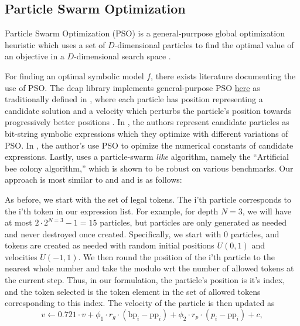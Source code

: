 \documentclass[runningheads]{llncs}
\begin{document}
\subsection{Particle Swarm Optimization} \label{subsec:ParticleSwarmOptimization}
Particle Swarm Optimization (PSO) is a general-purrpose global optimization heuristic which uses a set of $D$-dimensional particles to find the optimal value of an objective in a $D$-dimensional search space \cite{clerc:hal-00764996}. 
\par For finding an optimal symbolic model $f$, there exists literature documenting the use of PSO. The deap library implements general-purpose PSO \href{https://github.com/DEAP/deap/blob/60913c5543abf8318ddce0492e8ffcdf37974d86/examples/pso/basic.py}{here} as traditionally defined in \cite{PoliOverviewPSO}, where each particle has position representing a candidate solution and a velocity which perturbs the particle's position towards progressively better positions \cite{DEAP_JMLR2012}. In \cite{10.1007/978-3-319-70093-9_37}, the authors represent candidate particles as bit-string symbolic expressions which they optimize with different variations of PSO. In \cite{Lu2021}, the author's use PSO to opimize the numerical constants of candidate expressions. Lastly, \cite{KARABOGA20121} uses a particle-swarm \emph{like} algorithm, namely the ``Artificial bee colony algorithm,'' which is shown to be robust on various benchmarks. Our approach is most similar to \cite{DEAP_JMLR2012} and \cite{10.1007/978-3-319-70093-9_37} and is as follows:
\par As before, we start with the set of legal tokens. The i'th particle corresponds to the i'th token in our expression list. For example, for depth $N = 3$, we will have at most $2\cdot 2^{N = 3} - 1 = 15$ particles, but particles are only generated as needed and never destroyed once created. Specifically, we start with 0 particles, and tokens are created as needed with random initial positions $U(0,1)$ and velocities $U(-1,1)$. We then round the position of the i'th particle to the nearest whole number and take the modulo wrt the number of allowed tokens at the current step. Thus, in our formulation, the particle's position is it's index, and the token selected is the token element in the set of allowed tokens corresponding to this index. The velocity of the particle is then updated as \cite{clerc:hal-00764996} \cite{offShellPSO}
\begin{equation}
		v \gets 0.721\cdot v + \phi_1 \cdot r_g \cdot (\mathrm{bp}_i - \mathrm{pp}_i) + \phi_2\cdot r_p \cdot (p_i - \mathrm{pp}_i) + c,
\end{equation}
\end{document}
